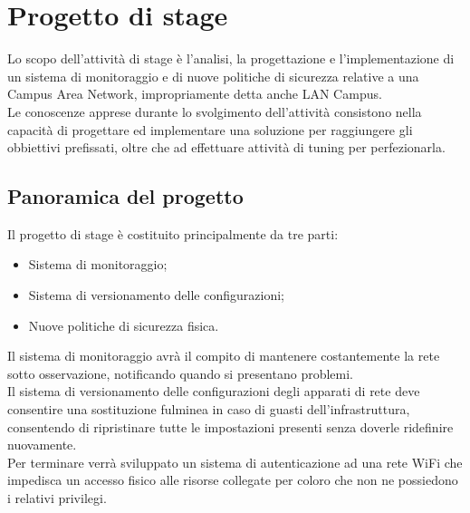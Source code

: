 \documentclass[Tesi.tex]{subfiles}
\begin{document}
\chapter{Progetto di stage}
Lo scopo dell'attività di stage è l’analisi, la progettazione e l'implementazione di un sistema di monitoraggio e di nuove politiche di sicurezza relative a una Campus Area Network, impropriamente detta anche LAN Campus. \\
Le conoscenze apprese durante lo svolgimento dell'attività consistono nella capacità di progettare ed implementare una soluzione per raggiungere gli obbiettivi prefissati, oltre che ad effettuare attività di tuning per perfezionarla.


\section{Panoramica del progetto}

Il progetto di stage è costituito principalmente da tre parti:
\begin{itemize}
	\item Sistema di monitoraggio;
	\item Sistema di versionamento delle configurazioni;
	\item Nuove politiche di sicurezza fisica.
\end{itemize}

Il sistema di monitoraggio avrà il compito di mantenere costantemente la rete sotto osservazione, notificando quando si presentano problemi. \\
Il sistema di versionamento delle configurazioni degli apparati di rete deve consentire una sostituzione fulminea in caso di guasti dell'infrastruttura, consentendo di ripristinare tutte le impostazioni presenti senza doverle ridefinire nuovamente. \\
Per terminare verrà sviluppato un sistema di autenticazione ad una rete WiFi che impedisca un accesso fisico alle risorse collegate per coloro che non ne possiedono i relativi privilegi.\\
\end{document}
